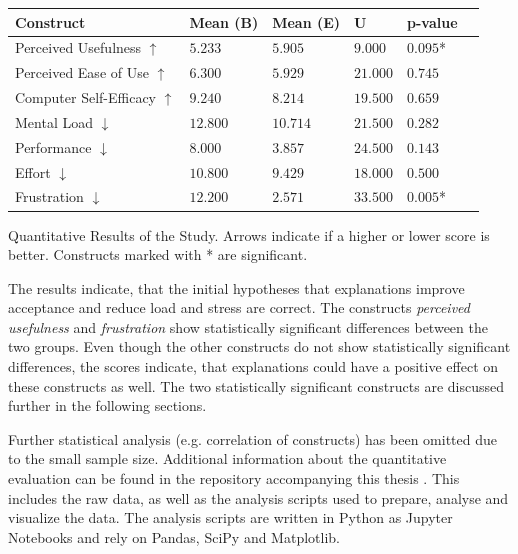 
\begin{ctable}
    \begin{tabularx}{\textwidth}{l|X|X|X|X|X}
        \textbf{Construct} & \textbf{Mean (B)} & \textbf{Mean (E)} & \textbf{U} & \textbf{p-value} \\
        \hline
        Perceived Usefulness $\uparrow$ & $5.233$ &  $5.905$ &  $9.000$ &  $0.095$* \\
        Perceived Ease of Use $\uparrow$ & $6.300$ &  $5.929$ &  $21.000$ &  $0.745$ \\
        Computer Self-Efficacy $\uparrow$ & $9.240$ &  $8.214$ &  $19.500$ &  $0.659$ \\
        Mental Load $\downarrow$ & $12.800$ &  $10.714$ &  $21.500$ &  $0.282$ \\
        Performance $\downarrow$ & $8.000$ &  $3.857$ &  $24.500$ &  $0.143$ \\
        Effort $\downarrow$ & $10.800$ &  $9.429$ &  $18.000$ &  $0.500$ \\
        Frustration $\downarrow$ & $12.200$ &  $2.571$ &  $33.500$ &  $0.005$* \\
    \end{tabularx}
    \caption[Quantitative Results of the Study]{Quantitative Results of the Study. Arrows indicate if a higher or lower score is better. Constructs marked with * are significant.}
    \label{tab:quant_results}
\end{ctable}

The results indicate, that the initial hypotheses that explanations improve acceptance and reduce load and stress are correct. The constructs \textit{perceived usefulness} and \textit{frustration} show statistically significant differences between the two groups. Even though the other constructs do not show statistically significant differences, the scores indicate, that explanations could have a positive effect on these constructs as well. The two statistically significant constructs are discussed further in the following sections.

Further statistical analysis (e.g. correlation of constructs) has been omitted due to the small sample size. Additional information about the quantitative evaluation can be found in the repository accompanying this thesis \parencite{Goepfert2025}. This includes the raw data, as well as the analysis scripts used to prepare, analyse and visualize the data. The analysis scripts are written in Python as Jupyter Notebooks and rely on Pandas, SciPy and Matplotlib.

